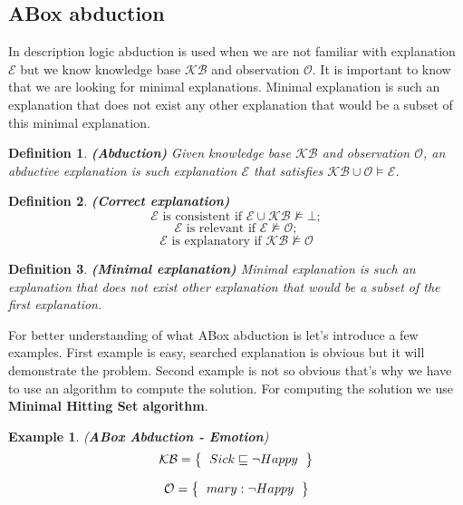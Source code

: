 \documentclass[12pt,a4paper]{article}
\newtheorem{definition}{Definition}[subsection]
\newtheorem{example}{Example}[subsection]
\begin{document}
\subsection{ABox abduction}
In description logic abduction is used when we are not familiar with explanation $\mathcal{E}$ but we know knowledge base $\mathcal{KB}$ and observation $\mathcal{O}$. It is important to know that we are looking for minimal explanations. Minimal explanation is such an explanation that does not exist any other explanation that would be a subset of this minimal explanation.

\begin{definition}{\textbf{(Abduction)}} 
	Given knowledge base $\mathcal{KB}$ and observation $\mathcal{O}$, an abductive explanation is such explanation $\mathcal{E}$ that satisfies $\mathcal{KB} \cup \mathcal{O} \models \mathcal{E}$.
\end{definition}

\begin{definition}{\textbf{(Correct explanation)}}
	\[ \mathcal{E} \text{ is consistent if } \mathcal{E} \cup \mathcal{KB} \not \models \mathcal{\bot}; \] 
	\[ \mathcal{E} \text{ is relevant if } \mathcal{E} \not \models \mathcal{O}; \]
	\[ \mathcal{E} \text{ is explanatory if } \mathcal{KB} \not \models \mathcal{O} \]
\end{definition}

\begin{definition}{\textbf{(Minimal explanation)}}
	Minimal explanation is such an explanation that does not exist other explanation that would be a subset of the first explanation.
\end{definition}

For better understanding of what ABox abduction is let's introduce a few examples. First example is easy, searched explanation is obvious but it will demonstrate the problem. Second example is not so obvious that's why we have to use an algorithm to compute the solution. For computing the solution we use \textbf{Minimal Hitting Set algorithm}.

\begin{example}{(\textbf{ABox Abduction - Emotion})}
	\[ 
	\mathcal{KB} = \left\{
	\begin{tabular}{l c}
	$Sick \sqsubseteq \neg Happy$
	\end{tabular}
	\right \}
	\]
	
	\[ 
	\mathcal{O} = \left\{
	\begin{tabular}{l c}
	$mary : \neg Happy$
	\end{tabular}
	\right \}
	\]								
\end{example}
\end{document}

